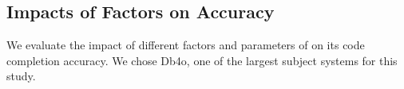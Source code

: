 \subsection{Impacts of Factors on Accuracy}

We evaluate the impact of different factors and parameters of {\tool}
on its code completion accuracy. We chose Db4o, one of the largest
subject systems for this study.







